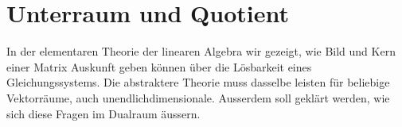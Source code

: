 %
%
%
\chapter{Unterraum und Quotient%
\label{chapter:quotient}}
\rhead{}
In der elementaren Theorie der linearen Algebra wir gezeigt, wie 
Bild und Kern einer Matrix Auskunft geben können über die Lösbarkeit
eines Gleichungssystems.
Die abstraktere Theorie muss dasselbe leisten für beliebige Vektorräume,
auch unendlichdimensionale.
Ausserdem soll geklärt werden, wie sich diese Fragen im Dualraum
äussern.





